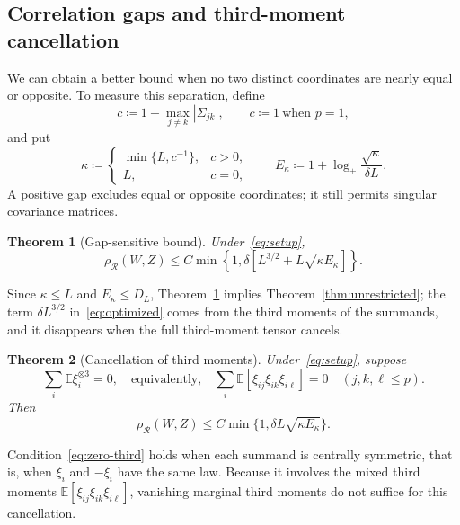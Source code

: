 \documentclass[11pt,letterpaper]{article}
\newtheorem{theorem}{Theorem}
\theoremstyle{remark}
\newcommand{\E}{\mathbb E}
\newcommand{\rh}{\rho_{\mathcal R}}
\begin{document}
\subsection{Correlation gaps and third-moment cancellation}
We can obtain a better bound when no two distinct coordinates are nearly
equal or opposite. To measure this separation, define
\[
 c\coloneqq 1-\max_{j\ne k}|\Sigma_{jk}|,
 \qquad c\coloneqq 1\ \text{when }p=1,
\]
and put
\begin{equation}
 \kappa\coloneqq \begin{cases}\min\{L,c^{-1}\},&c>0,\\L,&c=0,\end{cases}
 \qquad E_\kappa\coloneqq 1+\log_+\frac{\sqrt\kappa}{\delta L}.
 \label{eq:parameters}
\end{equation}
A positive gap excludes equal or opposite coordinates; it still permits
singular covariance matrices.

\begin{theorem}[Gap-sensitive bound]\label{thm:optimized}
Under~\eqref{eq:setup},
\begin{equation}
 \rh(W,Z)\le C\min\!\left\{1,
 \delta[L^{3/2}+L\sqrt{\kappa E_\kappa}]\right\}.
 \tag{R*}\label{eq:optimized}
\end{equation}
\end{theorem}

Since \(\kappa\le L\) and \(E_\kappa\le D_L\),
Theorem~\ref{thm:optimized} implies Theorem~\ref{thm:unrestricted};
the term \(\delta L^{3/2}\) in~\eqref{eq:optimized} comes from the
third moments of the summands,
and it disappears when the full third-moment tensor cancels.

\begin{theorem}[Cancellation of third moments]\label{thm:zero-skew}
Under~\eqref{eq:setup}, suppose
\begin{equation}
 \sum_i\E\xi_i^{\otimes3}=0,
 \quad\text{equivalently,}\quad
 \sum_i\E[\xi_{ij}\xi_{ik}\xi_{i\ell}]=0
 \quad(j,k,\ell\le p).
 \label{eq:zero-third}
\end{equation}
Then
\begin{equation}
 \rh(W,Z)\le C\min\{1,\delta L\sqrt{\kappa E_\kappa}\}.
 \tag{ZS}\label{eq:zero-skew}
\end{equation}
\end{theorem}

Condition~\eqref{eq:zero-third} holds when each summand is centrally
symmetric, that is, when \(\xi_i\) and \(-\xi_i\) have the same law. Because it
involves the mixed third moments \(\E[\xi_{ij}\xi_{ik}\xi_{i\ell}]\), vanishing
marginal third moments do not suffice for this cancellation.
\end{document}
